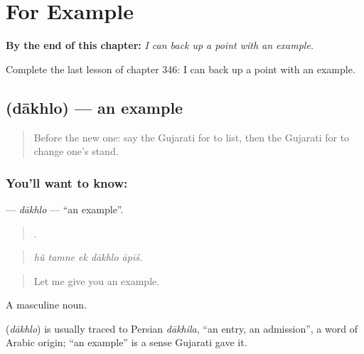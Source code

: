 
\chapter{For Example}
\label{ch:gu-for-example}

\begin{chapteropening}
\textbf{By the end of this chapter:} \emph{I can back up a point with an example.}

Complete the last lesson of chapter 346: I can back up a point with an example.
\end{chapteropening}

\section[\texorpdfstring{\gu{દાખલો} (dākhlo)}{દાખલો (dākhlo)}]{ (dākhlo) — an example}

\label{lesson:GU-C346-dakhlo}



\begin{quote}
Before the new one: say the Gujarati for to list, then the Gujarati for to change one's stand.
\end{quote}

\subsection*{You'll want to know: }
\textbf{} — \emph{dākhlo} — \textquotedblleft{}an example\textquotedblright{}.

\begin{quote}
    .
\end{quote}

\begin{quote}
\emph{hũ tamne ek dākhlo āpīś.}
\end{quote}

\begin{quote}
Let me give you an example.
\end{quote}

A masculine noun.

\begin{cousinweb}
\textbf{} (\emph{dākhlo}) is usually traced to Persian \emph{dākhila}, \textquotedblleft{}an entry, an admission\textquotedblright{}, a word of Arabic origin; \textquotedblleft{}an example\textquotedblright{} is a sense Gujarati gave it.
\end{cousinweb}

